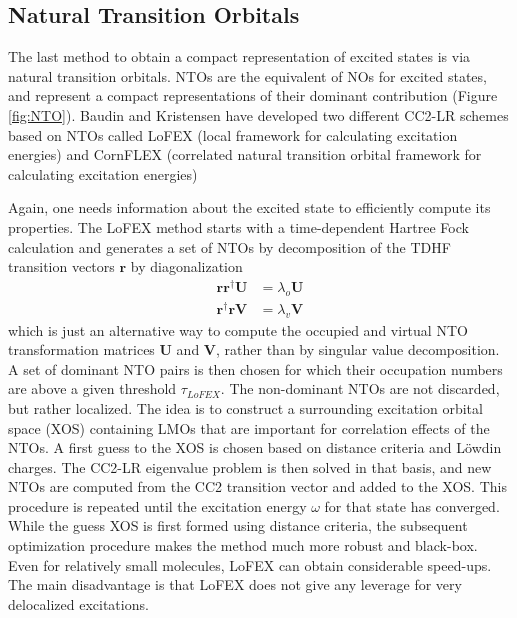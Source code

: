 
 
\subsection{Natural Transition Orbitals}

The last method to obtain a compact representation of excited states is via natural transition orbitals. NTOs are the equivalent of NOs for excited states, and represent a compact representations of their dominant contribution (Figure \ref{fig:NTO}). Baudin and Kristensen have developed two different CC2-LR schemes based on NTOs called LoFEX (local framework for calculating excitation energies) \cite{Bau2016} and CornFLEX (correlated natural transition orbital framework for calculating excitation energies) \cite{Bau2017} 

Again, one needs information about the excited state to efficiently compute its properties. The LoFEX method starts with a time-dependent Hartree Fock calculation and generates a set of NTOs by decomposition of the TDHF transition vectors $\mathbf{r}$ by diagonalization
\begin{align}
\mathbf{r} \mathbf{r}^{\dagger} \mathbf{U} &= \lambda_o \mathbf{U} \\
\mathbf{r}^{\dagger} \mathbf{r} \mathbf{V} &= \lambda_v \mathbf{V}
\end{align}
\noindent which is just an alternative way to compute the occupied and virtual NTO transformation matrices $\mathbf{U}$ and $\mathbf{V}$, rather than by singular value decomposition. A set of dominant NTO pairs is then chosen for which their occupation numbers are above a given threshold $\tau_{LoFEX}$. The non-dominant NTOs are not discarded, but rather localized. The idea is to construct a surrounding excitation orbital space (XOS) containing LMOs that are important for correlation effects of the NTOs. A first guess to the XOS is chosen based on distance criteria and Löwdin charges. The CC2-LR eigenvalue problem is then solved in that basis, and new NTOs are computed from the CC2 transition vector and added to the XOS. This procedure is repeated until the excitation energy $\omega$ for that state has converged. While the guess XOS is first formed using distance criteria, the subsequent optimization procedure makes the method much more robust and black-box. Even for relatively small molecules, LoFEX can obtain considerable speed-ups. The main disadvantage is that LoFEX does not give any leverage for very delocalized excitations. 

